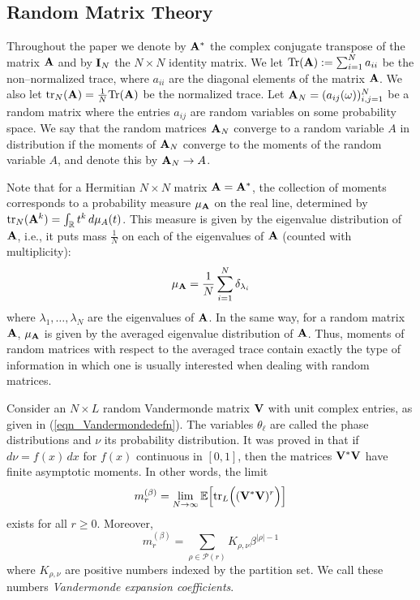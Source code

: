 \documentclass[smallextended]{svjour3}
\begin{document}
\subsection{Random Matrix Theory}

Throughout the paper we denote by ${\bf A}^{*}$ the complex conjugate transpose of the matrix ${\bf A}$ and by ${\bf I}_{N}$ the $N\times N$ identity matrix. We let $\mathrm{Tr}({\bf A}):=\sum_{i=1}^{N}{a_{ii}}$ be the non--normalized trace, where $a_{ii}$ are the diagonal elements of the matrix ${\bf A}$. We also let $\mathrm{tr}_{N}({\bf A})=\frac{1}{N}\mathrm{Tr}({\bf A})$ be the normalized trace. Let ${\bf A}_{N}=(a_{ij}(\omega))_{i,j=1}^{N}$ be a random matrix where the entries $a_{ij}$ are random variables on some probability space. We say that the random matrices ${\bf A}_{N}$ converge to a random variable $A$ in distribution if the moments of ${\bf A}_{N}$ converge to the moments of the random variable $A$, and denote this by ${\bf A}_{N}\to A$.

\par Note that for a Hermitian $N\times N$ matrix ${\bf A} = {\bf A}^{*}$, the collection of moments corresponds to a probability measure $\mu_{{\bf A}}$ on the real line, determined by $\mathrm{tr}_{N}({\bf A}^{k})=\int_{\mathbb{R}}{t^{k}\,d\mu_{A}(t)}$. This measure is given by the eigenvalue distribution of ${\bf A}$, i.e., it puts mass $\frac{1}{N}$ on each of the eigenvalues of ${\bf A}$ (counted with multiplicity):
\begin{equation}
 \mu_{{\bf A}}=\frac{1}{N}\sum_{i=1}^{N}{\delta_{\lambda_{i}}}
\end{equation}
where $\lambda_{1},\ldots,\lambda_{N}$ are the eigenvalues of ${\bf A}$. In the same way, for a random matrix ${\bf A}$, $\mu_{{\bf A}}$ is given by the averaged eigenvalue distribution of ${\bf A}$. Thus, moments of random matrices with respect to the averaged trace contain exactly the type of information in which one is usually interested when dealing with random matrices.

\par Consider an $N\times L$ random Vandermonde matrix $\bf V$ with unit complex entries, as given in  (\ref{eqn_Vandermondedefn}). The variables $\theta_{\ell}$ are called the phase distributions and $\nu$ its probability distribution. It was proved in \cite{GC02} that if $d\nu=f(x)\,dx$ for $f(x)$ continuous in $[0,1]$, then the matrices ${\bf V^{*}\bf V}$ have finite asymptotic moments. In other words, the limit
\begin{equation}
m_{r}^{(\beta)}=\lim_{N\to\infty}{\mathbb{E}\Big[\mathrm{tr}_{L}\Big(({\bf V^{*}V})^r \Big)\Big]}
\end{equation}
exists for all $r\geq 0$. Moreover, 
\begin{equation}
m_{r}^{(\beta)}=\sum_{\rho\in\mathcal{P}(r)}{K_{\rho,\nu}\beta^{|\rho|-1}}
\end{equation}
where $K_{\rho,\nu}$ are positive numbers indexed by the partition set. We call these numbers {\it Vandermonde expansion coefficients}. 
\end{document}
